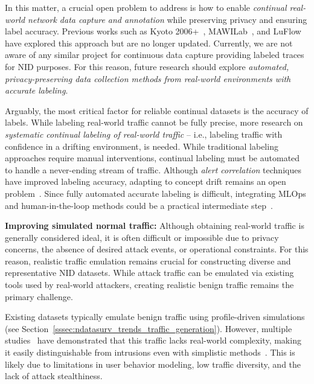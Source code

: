 In this matter, a crucial open problem to address is how to enable \emph{continual real-world network data capture and annotation} while preserving privacy and ensuring label accuracy. Previous works such as Kyoto 2006+~\cite{song2011_kyoto_dataset}, MAWILab~\cite{fontugne2010_mawilab}, and LuFlow~\cite{mills2022_luflow} have explored this approach but are no longer updated. Currently, we are not aware of any similar project for continuous data capture providing labeled traces for NID purposes. For this reason, future research should explore \emph{automated, privacy-preserving data collection methods from real-world environments with accurate labeling}.

Arguably, the most critical factor for reliable continual datasets is the accuracy of labels. While labeling real-world traffic cannot be fully precise, more research on \emph{systematic continual labeling of real-world traffic} -- i.e., labeling traffic with confidence in a drifting environment, is needed. While traditional labeling approaches require manual interventions, continual labeling must be automated to handle a never-ending stream of traffic. Although \emph{alert correlation} techniques~\cite{kotenko2022_slr_security_event_correlation} have improved labeling accuracy, adapting to concept drift remains an open problem~\cite{agrahari2022_concept_drift_detection_review}. Since fully automated accurate labeling is difficult, integrating MLOps and human-in-the-loop methods could be a practical intermediate step~\cite{guerra2022_datasets_labeling}.

\textbf{Improving simulated normal traffic:} Although obtaining real-world traffic is generally considered ideal, it is often difficult or impossible due to privacy concerns, the absence of desired attack events, or operational constraints. For this reason, realistic traffic emulation remains crucial for constructing diverse and representative NID datasets. While attack traffic can be emulated via existing tools used by real-world attackers, creating realistic benign traffic remains the primary challenge.

Existing datasets typically emulate benign traffic using profile-driven simulations (see Section~\ref{sssec:ndatasurv_trends_traffic_generation}). However, multiple studies~\cite{layeghy2024_benchmarking_benchmark,engelen2022_pillars_of_sand,silva2022_netsec_datasets_bias} have demonstrated that this traffic lacks real-world complexity, making it easily distinguishable from intrusions even with simplistic methods~\cite{dhooge2023_castles}. This is likely due to limitations in user behavior modeling, low traffic diversity, and the lack of attack stealthiness.

